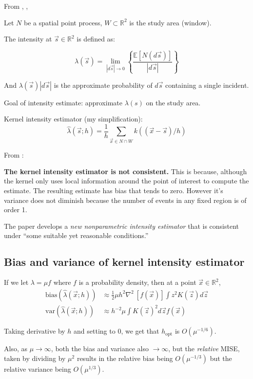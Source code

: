 



From \citet{diggle1988equivalence}, \citet{guan2008consistent}, \citet{wand1994kernel}

Let \(N\) be a spatial point process, \(W \subset \mathbb{R}^2 \) is the study area (window).

The intensity at \(\vec{s} \in \mathbb{R}^2\) is defined as:

\[
    \lambda (\vec{s}) = \lim_{|d\vec{s}| \to 0} \left\{ \frac{\mathbb{E}[N(d\vec{s})]}{|d\vec{s}|} \right\}
\]

And \(\lambda(\vec{s})|d\vec{s}|\) is the approximate probability of \(d\vec{s}\) containing a single incident.

Goal of intensity estimate: approximate \(\lambda(s)\) on the study area.

Kernel intensity estimator (my simplification):
\[
    \hat{\lambda}(\vec{s}; h) = \frac{1}{h} \sum_{\vec{x} \in N \cap W}{k((\vec{x}-\vec{s})/h)}
\]

From \citet{guan2008consistent}:

{
\color{red}
\textbf{The kernel intensity estimator is not consistent.}
This is because, although the kernel only uses local information around the point of interest to compute the estimate.
The resulting estimate has bias that tends to zero.
However it's variance does not diminish because the number of events in any fixed region is of order 1.
}

The paper develops a \textit{new nonparametric intensity estimator} that is consistent under ``some suitable yet reasonable conditions.''

\subsection{Bias and variance of kernel intensity estimator}

If we let \(\lambda = \mu f\) where \(f\) is a probability density, then at a point \(\vec{x} \in \mathbb{R}^2\),
\begin{align}
\mbox{bias}(\hat{\lambda}(\vec{x};h)) & \approx \frac{1}{2} \mu h^2 \nabla^2~\left[ f(\vec{x}) \right] \int {z^2 K(\vec{z}) d\vec{z}} \\
\mbox{var}(\hat{\lambda}(\vec{x};h)) & \approx h^{-2} \mu \int {K(\vec{z})^2d\vec{z}} f(\vec{x})
\end{align}

Taking derivative by \(h\) and setting to \(0\), we get that \(h_{\mbox{opt}}\) is \(O(\mu^{-1/6})\).

Also, as \(\mu \to \infty\), both the bias and variance also \(\to \infty\),
but the \textit{relative} MISE, taken by dividing by \(\mu^2\) results in the relative bias being \(O(\mu^{-1/3})\)
but the relative variance being \(O(\mu^{1/3})\).



